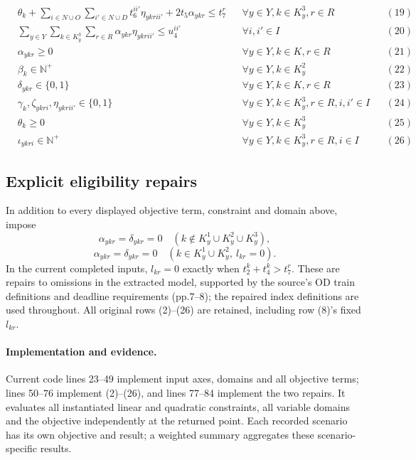 \documentclass[11pt]{article}
\begin{document}
\[\begin{aligned}
& \theta_k + \sum_{i \in N \cup O} \sum_{i' \in N \cup D} t_6^{ii'} \eta_{ykrii'} + 2 t_5 \alpha_{ykr} \leq t_7^r && \forall y \in Y, k \in K^3_y, r \in R && (19) \\
& \sum_{y \in Y} \sum_{k \in K^3_y} \sum_{r \in R} \alpha_{ykr} \eta_{ykrii'} \leq u_4^{ii'} && \forall i, i' \in I && (20) \\
& \alpha_{ykr} \geq 0 && \forall y \in Y, k \in K, r \in R && (21) \\
& \beta_k \in \mathbb{N}^+ && \forall y \in Y, k \in K^2_y && (22) \\
& \delta_{ykr} \in \{0, 1\} && \forall y \in Y, k \in K, r \in R && (23) \\
& \gamma_k, \zeta_{ykri}, \eta_{ykrii'} \in \{0, 1\} && \forall y \in Y, k \in K^3_y, r \in R, i, i' \in I && (24) \\
& \theta_k \geq 0 && \forall y \in Y, k \in K^3_y && (25) \\
& \iota_{ykri} \in \mathbb{N}^+ && \forall y \in Y, k \in K^3_y, r \in R, i \in I && (26)
\end{aligned}
\]


\subsection*{Explicit eligibility repairs}
In addition to every displayed objective term, constraint and domain above,
impose
\[
\alpha_{ykr}=\delta_{ykr}=0
\quad(k\notin K_y^1\cup K_y^2\cup K_y^3),
\]
\[
\alpha_{ykr}=\delta_{ykr}=0
\quad(k\in K_y^1\cup K_y^2,\ l_{kr}=0).
\]
In the current completed inputs,
$l_{kr}=0$ exactly when $t_2^k+t_4^k>t_7^r$.
These are repairs to omissions in the extracted model, supported by the
source's OD train definitions and deadline requirements (pp.7--8);
the repaired index definitions are used throughout.
All original rows (2)--(26) are retained, including row (8)'s fixed $l_{kr}$.

\paragraph{Implementation and evidence.}
Current code lines 23--49 implement input axes, domains and all objective
terms; lines 50--76 implement (2)--(26), and lines 77--84 implement the two
repairs. It evaluates all instantiated linear and quadratic constraints,
all variable domains and the objective independently at the returned point.
 Each recorded
scenario has its own objective and result; a weighted summary aggregates these scenario-specific results.
\end{document}
